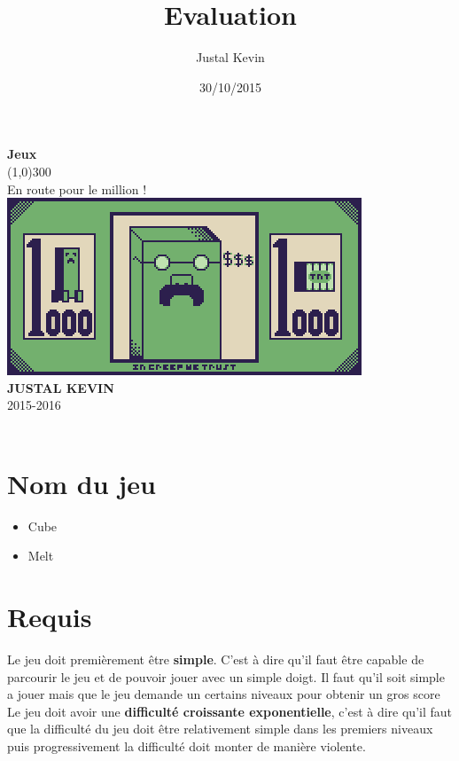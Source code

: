 \documentclass{article}
\title{Evaluation}
\author{Justal Kevin}
\date{30/10/2015}
\begin{document}
\begin{center}
\textbf{\Huge{Jeux}}\\
\line(1,0){300}\\
En route pour le million !\\
\vspace{3cm}
\includegraphics[width=\textwidth]{1}\\
\vspace{3cm}
\textbf{JUSTAL KEVIN}\\
2015-2016\\
\vspace{3cm}
\textbf{}\\
\end{center}

\newpage
\section{Nom du jeu}
\begin{itemize}
  \item Cube
  \item Melt
\end{itemize}
\section{Requis}
Le jeu doit premièrement être \textbf{simple}. C'est à dire qu'il faut être capable de parcourir le jeu et de pouvoir jouer avec un simple doigt. Il faut qu'il soit simple a jouer mais que le jeu demande un certains niveaux pour obtenir un gros score\\

Le jeu doit avoir une \textbf{difficulté croissante exponentielle}, c'est à dire qu'il faut que la difficulté du jeu doit être relativement simple dans les premiers niveaux puis progressivement la difficulté doit monter de manière violente.\\
\end{document}
